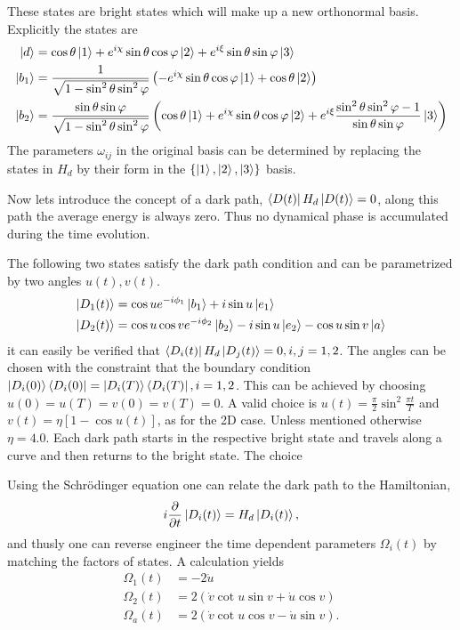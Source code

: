 These states are bright states which will make up a new orthonormal basis. 
Explicitly the states are 
\begin{equation}
\label{eq:states}
\begin{aligned}
\ket{d} &= \cos\theta\ket{1} + e^{i\chi}\sin\theta\cos\varphi\ket{2} + e^{i\xi}\sin\theta\sin\varphi\ket{3}
\\
\ket{b_1} &= \frac{1}{\sqrt{1-\sin^2\theta\sin^2\varphi}} \left(-e^{i\chi}\sin\theta\cos\varphi\ket{1} + \cos\theta\ket{2} \right)
\\
\ket{b_2} &= \frac{\sin\theta\sin\varphi}{\sqrt{1-\sin^2\theta\sin^2\varphi}} \left(\cos\theta\ket{1} + e^{i\chi}\sin\theta\cos\varphi\ket{2} + e^{i\xi}\frac{\sin^2\theta\sin^2\varphi - 1}{\sin\theta\sin\varphi} \ket{3}\right)
\end{aligned}
\end{equation}
The parameters $\omega_{ij}$ in the original basis can be determined by replacing the states in $H_d$ by their form in the $\{\ket{1},\ket{2},\ket{3}\}$ basis.

Now lets introduce the concept of a dark path, $\bra{D(t)}H_d\ket{D(t)} = 0$, along this path the average energy is always zero. Thus no dynamical phase is accumulated during the time evolution.

The following two states satisfy the dark path condition and can be parametrized by two angles $u(t), v(t)$.
\begin{equation}
\label{eq:dpaths}
\begin{aligned}
\ket{D_1(t)} &= \cos u e^{-i\phi_1}\ket{b_1} + i\sin u \ket{e_1}
\\
\ket{D_2(t)} &= \cos u\cos v e^{-i\phi_2}\ket{b_2} - i\sin u \ket{e_2} - \cos u\sin v \ket{a}
\end{aligned}
\end{equation}
it can easily be verified that $\bra{D_i(t)}H_d\ket{D_j(t)} = 0, i,j = 1,2$. The angles can be chosen with the constraint that the boundary condition $\ket{D_i(0)}\bra{D_i(0)} = \ket{D_i(T)}\bra{D_i(T)}, i = 1,2$. This can be achieved by choosing $u(0) = u(T) = v(0) = v(T) = 0$. A valid choice is $u(t) = \frac{\pi}{2}\sin^2\frac{\pi t}{T}$ and $v(t) = \eta\left[1 - \cos u(t)\right]$, as for the 2D case. Unless mentioned otherwise $\eta = 4.0$. Each dark path starts in the respective bright state and travels along a curve and then returns to the bright state. The choice 

Using the Schrödinger equation one can relate the dark path to the Hamiltonian,
\begin{equation}
i\pdv{}{t}\ket{D_i(t)} = H_d\ket{D_i(t)},
\end{equation}
and thusly one can reverse engineer the time dependent parameters $\Omega_i(t)$ by matching the factors of states. A calculation yields 
\begin{equation}
\begin{aligned}
\Omega_1(t) &= -2\dot{u}
\\ 
\Omega_2(t) &= 2\left(\dot{v}\cot u\sin v + \dot{u}\cos v \right)
\\
\Omega_a(t) &= 2\left(\dot{v}\cot u\cos v - \dot{u}\sin v \right).
\end{aligned}
\end{equation}

